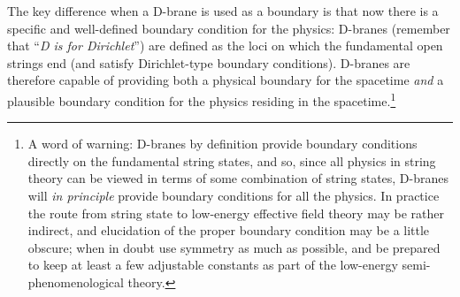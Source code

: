 \documentclass[a4paper,12pt]{article}
\begin{document}
The key difference when a D-brane is used as a boundary is that now
there is a specific and well-defined boundary condition for the
physics: D-branes (remember that ``{\em D is for Dirichlet\/}'') are
defined as the loci on which the fundamental open strings end (and
satisfy Dirichlet-type boundary conditions). D-branes are therefore
capable of providing both a physical boundary for the spacetime {\em
and} a plausible boundary condition for the physics residing in the
spacetime.\footnote{
A word of warning: D-branes by definition provide boundary conditions
directly on the fundamental string states, and so, since all physics
in string theory can be viewed in terms of some combination of string
states, D-branes will {\em in principle} provide boundary conditions
for all the physics. In practice the route from string state to
low-energy effective field theory may be rather indirect, and
elucidation of the proper boundary condition may be a little obscure;
when in doubt use symmetry as much as possible, and be prepared to
keep at least a few adjustable constants as part of the low-energy
semi-phenomenological theory.}
\end{document}
